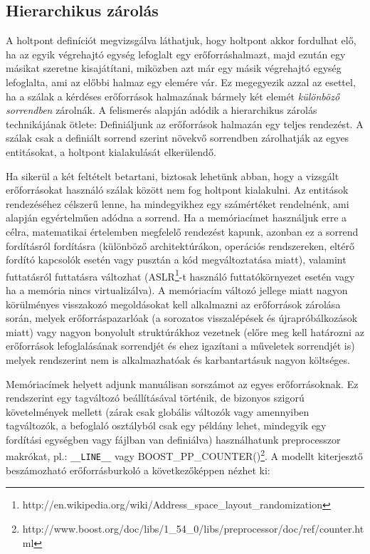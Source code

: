     \subsection{Hierarchikus zárolás} 
    \label{seq:hierarchical}
    A holtpont definíciót megvizsgálva láthatjuk, hogy holtpont akkor fordulhat elő, ha az egyik végrehajtó egység lefoglalt egy erőforráshalmazt, majd ezután egy másikat szeretne kisajátítani, miközben azt már egy másik végrehajtó egység lefoglalta, ami az előbbi halmaz egy elemére vár. Ez megegyezik azzal az esettel, ha a szálak a kérdéses erőforrások halmazának bármely két elemét \emph{különböző sorrendben} zárolnák. A felismerés alapján adódik a hierarchikus zárolás technikájának ötlete: Definiáljunk az erőforrások halmazán egy teljes rendezést. A szálak csak a definiált sorrend szerint növekvő sorrendben zárolhatják az egyes entitásokat, a holtpont kialakulását elkerülendő. 
    
    Ha sikerül a két feltételt betartani, biztosak lehetünk abban, hogy a vizsgált erőforrásokat használó szálak között nem fog holtpont kialakulni. Az entitások rendezéséhez célszerű lenne, ha mindegyikhez egy számértéket rendelnénk, ami alapján egyértelműen adódna a sorrend. Ha a memóriacímet használjuk erre a célra, matematikai értelemben megfelelő rendezést kapunk, azonban ez a sorrend fordításról fordításra (különböző architektúrákon, operációs rendszereken, eltérő fordító kapcsolók esetén vagy pusztán a kód megváltoztatása miatt), valamint futtatásról futtatásra változhat (ASLR\footnote{http://en.wikipedia.org/wiki/Address\_space\_layout\_randomization}-t használó futtatókörnyezet esetén vagy ha a memória nincs virtualizálva). A memóriacím változó jellege miatt nagyon körülményes visszakozó megoldásokat kell alkalmazni az erőforrások zárolása során, melyek erőforráspazarlóak (a sorozatos visszalépések és újrapróbálkozások miatt) vagy nagyon bonyolult struktúrákhoz vezetnek (előre meg kell határozni az erőforrások lefoglalásának sorrendjét és ehez igazítani a műveletek sorrendjét is) melyek rendszerint nem is alkalmazhatóak és karbantartásuk nagyon költséges.
    
    Memóriacímek helyett adjunk manuálisan sorszámot az egyes erőforrásoknak. Ez rendszerint egy tagváltozó beállításával történik, de bizonyos szigorú követelmények mellett (zárak csak globális változók vagy amennyiben tagváltozók, a befoglaló osztályból csak egy példány lehet, mindegyik egy fordítási egységben vagy fájlban van definiálva) használhatunk preprocesszor makrókat, pl.: \texttt{\_\_LINE\_\_} vagy \mbox{BOOST\_PP\_COUNTER()}\footnote{http://www.boost.org/doc/libs/1\_54\_0/libs/preprocessor/doc/ref/counter.html}. A \cite{C++11/Lockable} modellt kiterjesztő beszámozható erőforrásburkoló a következőképpen nézhet ki:
    

